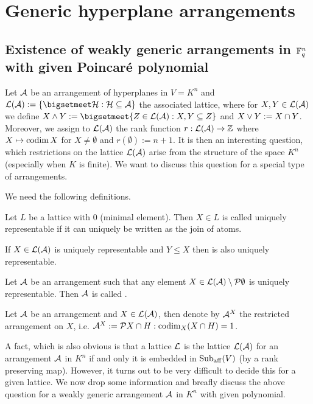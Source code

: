 \section{Generic hyperplane arrangements}

\subsection{Existence of weakly generic arrangements in $\mathbb{F}_{q}^n$ with given Poincaré polynomial}

Let $\mathcal{A}$ be an arrangement of hyperplanes in $V=K^n$ and $\cL(\cA):=\{\bigsetmeet \cH:\cH\setleq \cA\}$ the associated lattice, where for $X,Y\in\mathcal{L}(\mathcal{A})$ we define $X\meet Y:=\bigsetmeet\{Z\in\cL(\cA):X,Y\setleq Z\}$ and $X\vee Y:= X\cap Y$.
Moreover, we assign to $\mathcal{L}(\mathcal{A})$ the rank function $r:\mathcal{L}(\mathcal{A})\rightarrow \mathbb{Z}$ where $X\mapsto \mathop\mathrm{codim} X$ for $X\neq \emptyset$ and $r(\emptyset):=n+1$.
It is then an interesting question, which restrictions on the lattice $\mathcal{L}(\mathcal{A})$ arise from the structure of the space $K^n$ (especially when $K$ is finite). We want to discuss this question for a special type of arrangements.

We need the following definitions.

\begin{definition} 
    Let $L$ be a lattice with $0$ (minimal element). Then $X\in L$ is called uniquely representable if it can uniquely be written as the join of atoms.
\end{definition}

\begin{remark}
    If $X\in\mathcal{L}(\mathcal{A})$ is uniquely representable and $Y\leq X$ then is also uniquely representable. 
\end{remark}

\begin{definition}
    Let $\mathcal{A}$ be an arrangement such that any element $X\in\cL(\cA)\setminus\set{\emptyset}$ is uniquely representable. Then $\mathcal{A}$ is called .
\end{definition}

\begin{definition}
    Let $\mathcal{A}$ be an arrangement and $X\in\mathcal{L}(\mathcal{A})$, then denote by $\mathcal{A}^X$ the restricted arrangement on $X$, i.e. $\cA^X:=\set{X\setmeet H:\codim_X(X\setmeet H)=1}$.
\end{definition}

A fact, which is also obvious is that a lattice $\mathcal{L}$ is the lattice $\mathcal{L}(\mathcal{A})$ for an arrangement $\mathcal{A}$ in $K^n$ if and only it is embedded in $\mathop\mathrm{Sub}\nolimits_{\mathop\mathrm{aff}}(V)$ (by a rank preserving map). However, it turns out to be very difficult to decide this for a given lattice.
We now drop some information and breafly discuss the above question for a weakly generic arrangement $\mathcal{A}$ in $K^n$ with given  polynomial.

